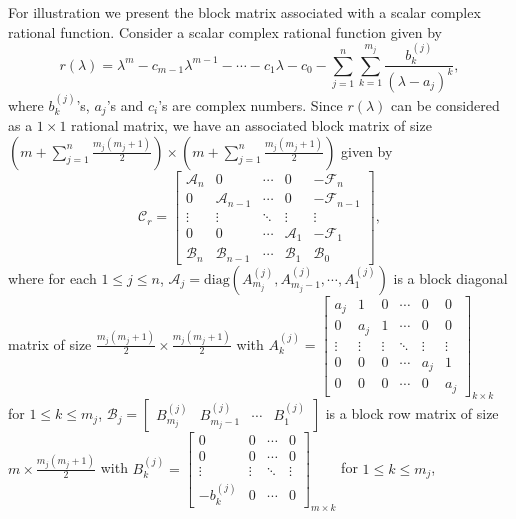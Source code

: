 \documentclass[12pt, reqno]{amsart}
\theoremstyle{definition}
\theoremstyle{remark}
\numberwithin{equation}{section}
\begin{document}
\medskip
For illustration we present the block matrix associated with a 
scalar complex rational function. Consider a scalar complex rational function 
given by
\begin{equation}\label{Eqn-scalar rational function-2}
r(\lambda) = \lambda^m- c_{m-1}\lambda^{m-1} - \cdots -c_1 \lambda - c_0 -  
\displaystyle \sum_{j=1}^{n} \sum_{k=1}^{m_j} \frac{b_k^{(j)}}{(\lambda-a_j)^k}, 
\end{equation}
where $b_k^{(j)}$'s, $a_j$'s and $c_i$'s are complex numbers.
Since $r(\lambda)$ can be considered as a $1\times 1$ rational matrix, 
we have an associated block matrix of size $\left( m + \displaystyle 
\sum_{j=1}^{n}\frac{m_j(m_j+1)}{2}\right) \times \left(m + \displaystyle 
\sum_{j=1}^{n}\frac{m_j(m_j+1)}{2}\right)$ given by 
\begin{equation}\label{Eqn-block matrix for scalar rational fcn}
\mathcal{C}_r= \begin{bmatrix}
\mathcal{A}_n & 0 & \cdots & 0 & -\mathcal{F}_n \\
0 & \mathcal{A}_{n-1} & \cdots & 0 & -\mathcal{F}_{n-1} \\
\vdots & \vdots & \ddots & \vdots & \vdots \\
0 & 0 & \cdots & \mathcal{A}_1 & -\mathcal{F}_1 \\
\mathcal{B}_n & \mathcal{B}_{n-1} & \cdots & \mathcal{B}_1 & \mathcal{B}_0
\end{bmatrix}, 
\end{equation}
where for each $1 \leq j \leq n$,   
$\mathcal{A}_j = \text{diag}(A_{m_j}^{(j)},A_{m_j-1}^{(j)},\cdots,A_1^{(j)})$ is a 
block diagonal matrix of size $\displaystyle \frac{m_j(m_j+1)}{2} \times \frac{m_j(m_j+1)}{2}$ with $A_k^{(j)} 
=\begin{bmatrix}
a_j & 1 & 0 & \cdots & 0 & 0 \\
0 & a_j & 1 & \cdots & 0 & 0 \\
\vdots & \vdots & \vdots & \ddots & \vdots & \vdots \\
0 & 0 & 0 & \cdots & a_j & 1 \\
0 & 0 & 0 & \cdots & 0 & a_j
\end{bmatrix}_{k \times k}$ for $1\leq k \leq m_j$,
$\mathcal{B}_j = \begin{bmatrix}
B_{m_j}^{(j)} & B_{m_j-1}^{(j)} & \cdots & B_1^{(j)}
\end{bmatrix}$ is a block row matrix of size $\displaystyle m \times 
\frac{m_j(m_j+1)}{2}$ with $B_k^{(j)} = \begin{bmatrix}
0 & 0 & \cdots & 0 \\
0 & 0 & \cdots & 0 \\
\vdots & \vdots & \ddots & \vdots \\
-b_{k}^{(j)} & 0 & \cdots & 0
\end{bmatrix}_{m \times k}$ for $ 1 \leq k \leq m_j $, 
\end{document}
